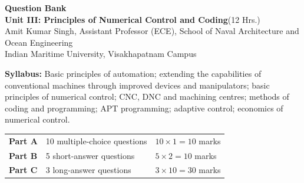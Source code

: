 \documentclass[11pt,a4paper]{article}
\begin{document}
	\begin{center}
		{\Large\bfseries\color{cAccent} Question Bank}\\[4pt]
		{\large\bfseries Unit III: Principles of Numerical Control and Coding}\quad(12 Hrs.)\\[6pt]
		{\small Amit Kumar Singh, Assistant Professor (ECE), School of Naval Architecture and Ocean Engineering\\
			Indian Maritime University, Visakhapatnam Campus}
	\end{center}

	\noindent\textbf{Syllabus:} Basic principles of automation; extending the capabilities of conventional machines through improved devices and manipulators; basic principles of numerical control; CNC, DNC and machining centres; methods of coding and programming; APT programming; adaptive control; economics of numerical control.

	\medskip
	\noindent
	\begin{tabular}{@{}lll@{}}
		\textbf{Part A} & 10 multiple-choice questions & $10\times1 = 10$ marks \\
		\textbf{Part B} & 5 short-answer questions      & $5\times2 = 10$ marks \\
		\textbf{Part C} & 3 long-answer questions       & $3\times10 = 30$ marks \\
	\end{tabular}
\end{document}
